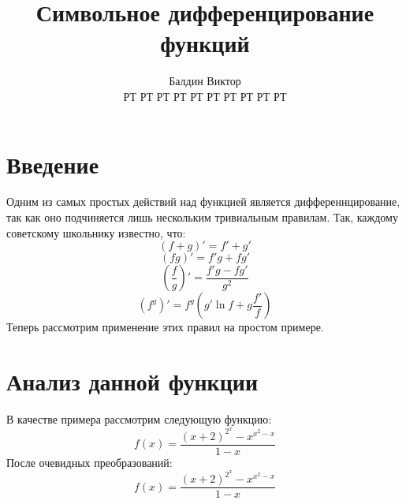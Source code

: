 \documentclass{article}
\title{Символьное дифференцирование функций}
\author{Балдин Виктор\\РТ РТ РТ РТ РТ РТ РТ РТ РТ РТ}
\begin{document}
\maketitle
\section{Введение}
Одним из самых простых действий над функцией является дифференнцирование, так как оно подчиняется лишь нескольким тривиальным правилам. Так, каждому советскому школьнику известно, что:
$$(f+g)'=f'+g'$$
$$(fg)' =f'g+fg'$$
$$\left(\frac{f}{g}\right)'=\frac{f'g-fg'}{g^2}$$
$$(f^g)'=f^g\left(g'\ln f+g\frac{f'}{f}\right)$$Теперь рассмотрим применение этих правил на простом примере.\section{Анализ данной функции}
В качестве примера рассмотрим следующую функцию:
$$f(x)=\frac{\left(x+2\right)^{2^{x}}-x^{x^{2}-x}}{1-x}$$
После очевидных преобразований:$$f(x)=\frac{\left(x+2\right)^{2^{x}}-x^{x^{2}-x}}{1-x}$$
\end{document}
